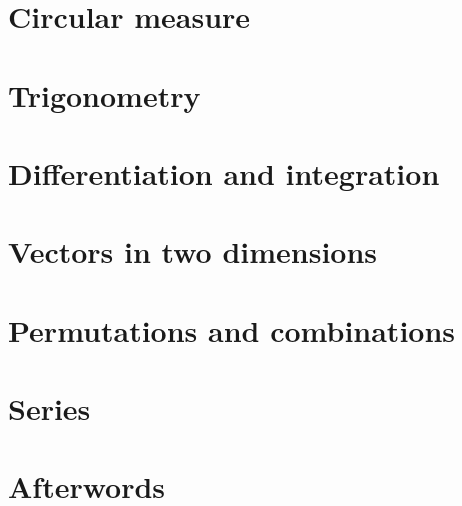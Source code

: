 \documentclass[8pt]{article}
\theoremstyle{remark}
\begin{document}
    \section{Circular measure}

    \section{Trigonometry}

    \section{Differentiation and integration}

    \section{Vectors in two dimensions}

    \section{Permutations and combinations}

    \section{Series}

    \section*{Afterwords}
        
\end{document}
